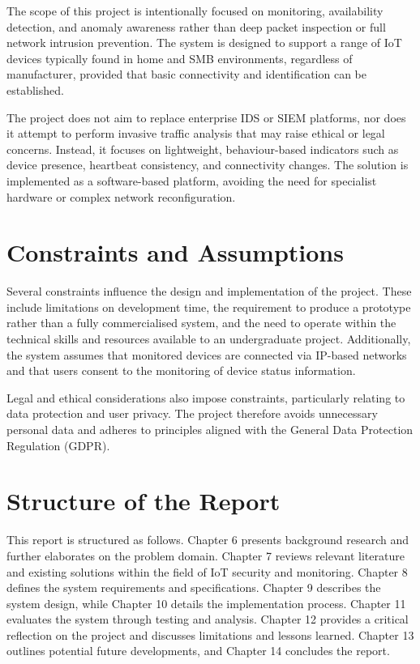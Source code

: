 The scope of this project is intentionally focused on monitoring, availability detection, and anomaly awareness rather than deep packet inspection or full network intrusion prevention. The system is designed to support a range of IoT devices typically found in home and SMB environments, regardless of manufacturer, provided that basic connectivity and identification can be established.

The project does not aim to replace enterprise IDS or SIEM platforms, nor does it attempt to perform invasive traffic analysis that may raise ethical or legal concerns. Instead, it focuses on lightweight, behaviour-based indicators such as device presence, heartbeat consistency, and connectivity changes. The solution is implemented as a software-based platform, avoiding the need for specialist hardware or complex network reconfiguration.

\section{Constraints and Assumptions}

Several constraints influence the design and implementation of the project. These include limitations on development time, the requirement to produce a prototype rather than a fully commercialised system, and the need to operate within the technical skills and resources available to an undergraduate project. Additionally, the system assumes that monitored devices are connected via IP-based networks and that users consent to the monitoring of device status information.

Legal and ethical considerations also impose constraints, particularly relating to data protection and user privacy. The project therefore avoids unnecessary personal data and adheres to principles aligned with the General Data Protection Regulation (GDPR).

\section{Structure of the Report}

This report is structured as follows. Chapter 6 presents background research and further elaborates on the problem domain. Chapter 7 reviews relevant literature and existing solutions within the field of IoT security and monitoring. Chapter 8 defines the system requirements and specifications. Chapter 9 describes the system design, while Chapter 10 details the implementation process. Chapter 11 evaluates the system through testing and analysis. Chapter 12 provides a critical reflection on the project and discusses limitations and lessons learned. Chapter 13 outlines potential future developments, and Chapter 14 concludes the report.
